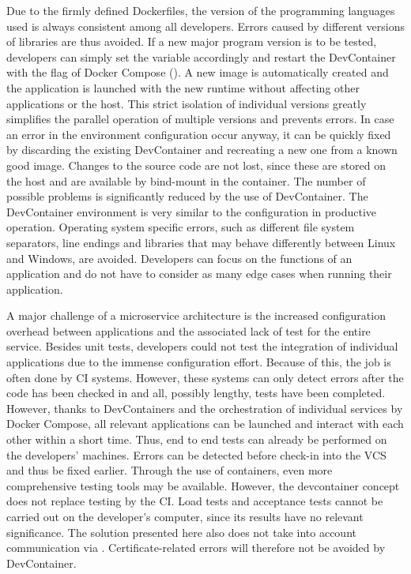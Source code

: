         Due to the firmly defined Dockerfiles, the version of the programming languages used is always consistent among all developers. Errors caused by different versions of libraries are thus avoided. If a new major program version is to be tested, developers can simply set the  variable accordingly and restart the DevContainer with the  flag of Docker Compose (). A new image is automatically created and the application is launched with the new runtime without affecting other applications or the host. This strict isolation of individual versions greatly simplifies the parallel operation of multiple versions and prevents errors.\newline
        In case an error in the environment configuration occur anyway, it can be quickly fixed by discarding the existing DevContainer and recreating a new one from a known good image. Changes to the source code are not lost, since these are stored on the host and are available by bind-mount in the container.
        The number of possible problems is significantly reduced by the use of DevContainer. The DevContainer environment is very similar to the configuration in productive operation. Operating system specific errors, such as different file system separators, line endings and libraries that may behave differently between Linux and Windows, are avoided. Developers can focus on the functions of an application and do not have to consider as many edge cases when running their application.

        A major challenge of a microservice architecture is the increased configuration overhead between applications and the associated lack of test for the entire service. Besides unit tests, developers could not test the integration of individual applications due to the immense configuration effort. Because of this, the job is often done by \ac{CI} systems. However, these systems can only detect errors after the code has been checked in and all, possibly lengthy, tests have been completed.\newline
        However, thanks to DevContainers and the orchestration of individual services by Docker Compose, all relevant applications can be launched and interact with each other within a short time. Thus, end to end tests can already be performed on the developers' machines. Errors can be detected before check-in into the \ac{VCS} and thus be fixed earlier. Through the use of containers, even more comprehensive testing tools may be available.\newline
        However, the devcontainer concept does not replace testing by the CI.  Load tests and acceptance tests cannot be carried out on the developer's computer, since its results have no relevant significance. The solution presented here also does not take into account communication via . Certificate-related errors will therefore not be avoided by DevContainer.

